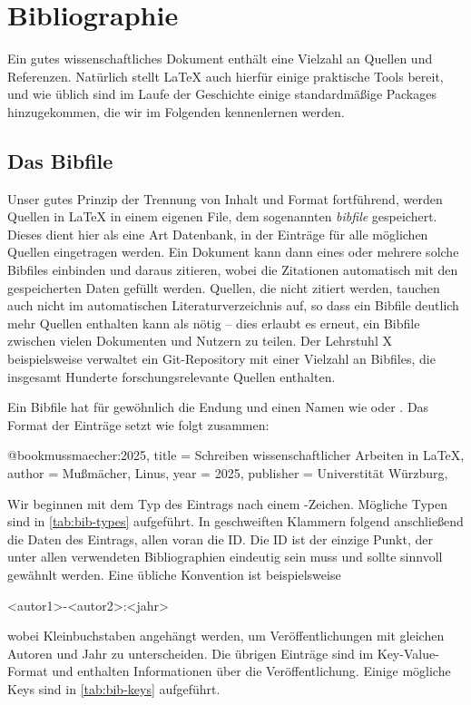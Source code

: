 \chapter{Bibliographie}

Ein gutes wissenschaftliches Dokument enthält eine Vielzahl an Quellen und Referenzen.
Natürlich stellt \LaTeX{} auch hierfür einige praktische Tools bereit, und wie üblich sind im Laufe der Geschichte einige standardmäßige Packages hinzugekommen, die wir im Folgenden kennenlernen werden.

\section{Das Bibfile}
Unser gutes Prinzip der Trennung von Inhalt und Format fortführend, werden Quellen in \LaTeX{} in einem eigenen File, dem sogenannten \emph{bibfile} gespeichert.
Dieses dient hier als eine Art Datenbank, in der Einträge für alle möglichen Quellen eingetragen werden.
Ein Dokument kann dann eines oder mehrere solche Bibfiles einbinden und daraus zitieren, wobei die Zitationen automatisch mit den gespeicherten Daten gefüllt werden.
Quellen, die nicht zitiert werden, tauchen auch nicht im automatischen Literaturverzeichnis auf, so dass ein Bibfile deutlich mehr Quellen enthalten kann als nötig -- dies erlaubt es erneut, ein Bibfile zwischen vielen Dokumenten und Nutzern zu teilen.
Der Lehrstuhl X beispielsweise verwaltet ein Git-Repository mit einer Vielzahl an Bibfiles, die insgesamt Hunderte forschungsrelevante Quellen enthalten.

Ein Bibfile hat für gewöhnlich die Endung  und einen Namen wie  oder .
Das Format der Einträge setzt wie folgt zusammen:
\begin{latexlisting}
	@book{mussmaecher:2025,
		title = {Schreiben wissenschaftlicher Arbeiten in LaTeX},
		author = {Mußmächer, Linus},
		year = {2025},
		publisher = {Universtität Würzburg},
	}
\end{latexlisting}
Wir beginnen mit dem Typ des Eintrags nach einem \key{\@}-Zeichen.
Mögliche Typen sind in \autoref{tab:bib-types} aufgeführt.
In geschweiften Klammern folgend anschließend die Daten des Eintrags, allen voran die ID.
Die ID ist der einzige Punkt, der unter allen verwendeten Bibliographien eindeutig sein muss und sollte sinnvoll gewähnlt werden.
Eine übliche Konvention ist beispielsweise
\begin{latexlisting}
	<autor1>-<autor2>:<jahr>
\end{latexlisting}
wobei Kleinbuchstaben angehängt werden, um Veröffentlichungen mit gleichen Autoren und Jahr zu unterscheiden.
Die übrigen Einträge sind im Key-Value-Format und enthalten Informationen über die Veröffentlichung.
Einige mögliche Keys sind in \autoref{tab:bib-keys} aufgeführt.

